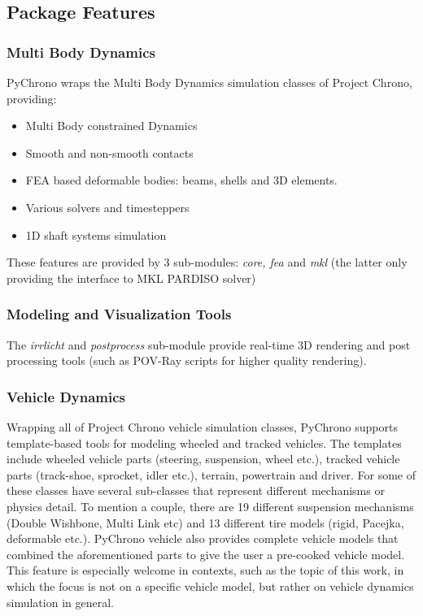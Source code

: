 \documentclass{svproc}
\begin{document}
\subsection{Package Features}
\subsubsection{Multi Body Dynamics}
PyChrono wraps the Multi Body Dynamics simulation classes of Project Chrono, providing:
\begin{itemize}
    \item Multi Body constrained Dynamics
    \item Smooth and non-smooth contacts
    \item FEA based deformable bodies: beams, shells and 3D elements.
    \item Various solvers and timesteppers
    \item 1D shaft systems simulation
\end{itemize}
These features are provided by 3 sub-modules: \textit{core, fea }and \textit{mkl} (the latter only providing the interface to MKL PARDISO solver)
\subsubsection{Modeling and Visualization Tools}
The \textit{irrlicht} and \textit{postprocess} sub-module provide real-time 3D rendering and post processing tools (such as POV-Ray scripts for higher quality rendering).
\subsubsection{Vehicle Dynamics}
Wrapping all of Project Chrono vehicle simulation classes, PyChrono supports template-based tools for modeling wheeled and tracked vehicles. The templates include wheeled vehicle parts (steering, suspension, wheel etc.), tracked vehicle parts (track-shoe, sprocket, idler etc.), terrain, powertrain and driver. 
For some of these classes have several sub-classes that represent different mechanisms or physics detail. To mention a couple, there are 19 different suspension mechanisms (Double Wishbone, Multi Link etc) and 13 different tire models (rigid, Pacejka, deformable etc.). PyChrono vehicle also provides complete vehicle models that combined the aforementioned parts to give the user a pre-cooked vehicle model. This feature is especially welcome in contexts, such as the topic of this work, in which the focus is not on a specific vehicle model, but rather on vehicle dynamics simulation in general.
\end{document}
